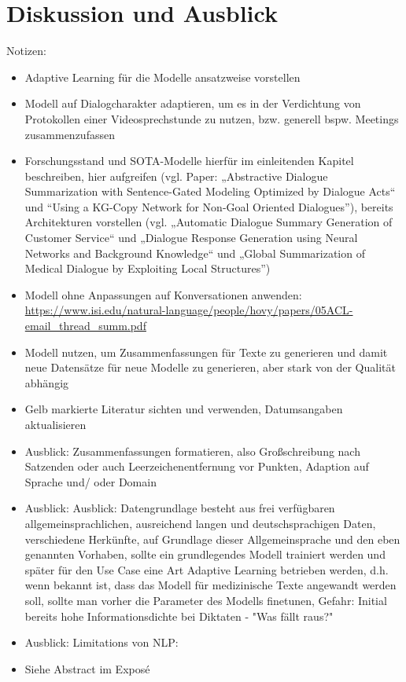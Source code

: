 \chapter{Diskussion und Ausblick}
\thispagestyle{fancy}
\label{chap:Diskussion und Ausblick}

Notizen:
\begin{itemize}
	\item Adaptive Learning für die Modelle ansatzweise vorstellen
	\item Modell auf Dialogcharakter adaptieren, um es in der Verdichtung von Protokollen einer Videosprechstunde zu nutzen, bzw. generell bspw. Meetings zusammenzufassen
	\item Forschungsstand und SOTA-Modelle hierfür im einleitenden Kapitel beschreiben, hier aufgreifen (vgl. Paper: „Abstractive Dialogue Summarization with Sentence-Gated Modeling Optimized by Dialogue Acts“ und “Using a KG-Copy Network for Non-Goal Oriented Dialogues”), bereits Architekturen vorstellen (vgl. „Automatic Dialogue Summary Generation of Customer Service“ und „Dialogue Response Generation using Neural Networks and Background Knowledge“ und „Global Summarization of Medical Dialogue by Exploiting Local Structures”)
	\item Modell ohne Anpassungen auf Konversationen anwenden: \url{https://www.isi.edu/natural-language/people/hovy/papers/05ACL-email_thread_summ.pdf}
	\item Modell nutzen, um Zusammenfassungen für Texte zu generieren und damit neue Datensätze für neue Modelle zu generieren, aber stark von der Qualität abhängig
	\item Gelb markierte Literatur sichten und verwenden, Datumsangaben aktualisieren
	\item Ausblick: Zusammenfassungen formatieren, also Großschreibung nach Satzenden oder auch Leerzeichenentfernung vor Punkten, Adaption auf Sprache und/ oder Domain
	\item Ausblick: Ausblick: Datengrundlage besteht aus frei verfügbaren allgemeinsprachlichen, ausreichend langen und deutschsprachigen Daten, verschiedene Herkünfte, auf Grundlage dieser Allgemeinsprache und den eben genannten Vorhaben, sollte ein grundlegendes Modell trainiert werden und später für den Use Case eine Art Adaptive Learning betrieben werden, d.h. wenn bekannt ist, dass das Modell für medizinische Texte angewandt werden soll, sollte man vorher die Parameter des Modells finetunen, Gefahr: Initial bereits hohe Informationsdichte bei Diktaten - "Was fällt raus?"
	\item Ausblick: Limitations von NLP: \cite[S.~30-31]{BIR09}
	\item Siehe Abstract im Exposé
\end{itemize}
